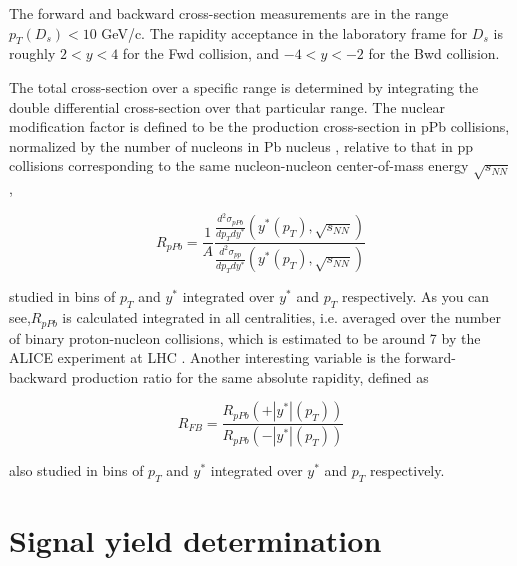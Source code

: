 \documentclass[
10pt, %
a4paper, %
oneside, %
headinclude,footinclude, %
BCOR5mm, %
]{scrartcl}
\begin{document}
The forward and backward cross-section measurements are in the range $p_T(D_s) <
 10$ GeV/c. The rapidity acceptance in the laboratory frame for $D_s$ is roughly $2 < y < 4$
 for the Fwd collision, and $-4 < y < -2$ for the Bwd collision.\par
 
 
The total cross-section over a specific range is determined by integrating the double differential cross-section over that particular range. The nuclear modification factor is defined to be the production cross-section in pPb collisions, normalized by the number of nucleons in Pb nucleus , relative to that in pp collisions corresponding to the same nucleon-nucleon center-of-mass energy $\sqrt{s_{NN}}$ ,

\begin{equation}
R_{pPb}=\frac{1}{A}\frac{\frac{d^2\sigma_{pPb}}{dp_Tdy^*}(y^*(p_T),\sqrt{s_{NN}})}{\frac{d^2\sigma_{pp}}{dp_Tdy^*}(y^*(p_T),\sqrt{s_{NN}})}
\end{equation}

studied in bins of $p_T$ and $y^*$ integrated over $y^*$ and $p_T$ respectively. As you can see,$R_{pPb}$ is calculated integrated in all centralities, i.e. averaged over the number of binary proton-nucleon collisions, which is estimated to be around 7 by the ALICE experiment at LHC . Another interesting variable is the forward-backward production ratio for the same absolute rapidity, defined as


\begin{equation}
R_{FB}=\frac{R_{pPb}(+|y^*|(p_T))}{R_{pPb}(-|y^*|(p_T))}
\end{equation}

also studied in bins of $p_T$ and $y^*$ integrated over $y^*$ and $p_T$ respectively.

\section{Signal yield determination}
\end{document}
